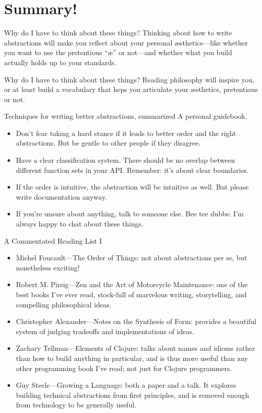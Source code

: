 \documentclass[aspectratio=169]{beamer}
\begin{document}
  \section{Summary!}
  \begin{frame}{Why do I have to think about these things?}
    Thinking about how to write abstractions will make you reflect about your
    personal æsthetics—like whether you want to use the pretentious “æ” or
    not—and whether what you build actually holds up to your standards.
  \end{frame}
  \begin{frame}{Why do I have to think about these things?}
    Reading philosophy will inspire you, or at least build a vocabulary that
    heps you articulate your æsthetics, pretentious or not.
  \end{frame}
  \begin{frame}{Techniques for writing better abstractions, summarized}
    A personal guidebook.
    \begin{itemize}
      \item Don’t fear taking a hard stance if it leads to better order and the
            right abstractions. But be gentle to other people if they disagree.
      \item Have a clear classification system. There should be no overlap
            between different function sets in your API. Remember: it’s about
            clear boundaries.
      \item If the order is intuitive, the abstraction will be intuitive as
            well. But please write documentation anyway.
      \item If you’re unsure about anything, talk to someone else. Bee tee
            dubbs: I’m always happy to chat about these things.
    \end{itemize}
  \end{frame}
  \begin{frame}{A Commentated Reading List I}
    \begin{itemize}
      \item Michel Foucault—The Order of Things: not about abstractions per se,
            but nonetheless exciting!
      \item Robert M. Pirsig—Zen and the Art of Motorcycle Maintenance: one of
            the best books I’ve ever read, stock-full of marvelous writing,
            storytelling, and compelling philosophical ideas.
      \item Christopher Alexander—Notes on the Synthesis of Form: provides a
            beautiful system of judging tradeoffs and implementations of ideas.
      \item Zachary Tellman—Elements of Clojure: talks about names and idioms
            rather than how to build anything in particular, and is thus more
            useful than any other programming book I’ve read; not just for
            Clojure programmers.
      \item Guy Steele—Growing a Language: both a paper and a talk. It explores
            building technical abstractions from first principles, and is
            removed enough from technology to be generally useful.
    \end{itemize}
  \end{frame}
\end{document}
